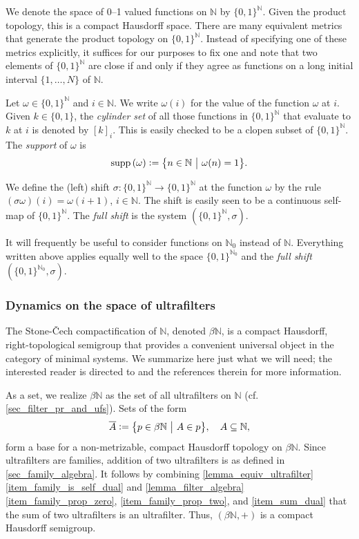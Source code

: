\documentclass[letter,11pt]{article}
\theoremstyle{plain}
\theoremstyle{definition}
\theoremstyle{plain}
\theoremstyle{plain}
\numberwithin{equation}{section}
\newcommand{\Cech}{\v{C}ech}
\newcommand{\supp}{{\normalfont\text{supp}}\,}
\newcommand{\N}{\mathbb{N}}
\newcommand{\defeq}{\vcentcolon=}
\begin{document}
We denote the space of 0--1 valued functions on $\N$ by $\{0,1\}^{\N}$. Given the product topology, this is a compact Hausdorff space.  There are many equivalent metrics that generate the product topology on $\{0,1\}^{\N}$.  Instead of specifying one of these metrics explicitly, it suffices for our purposes to fix one and note that two elements of $\{0,1\}^{\N}$ are close if and only if they agree as functions on a long initial interval $\{1, \ldots, N\}$ of $\N$.

Let $\omega \in \{0,1\}^{\N}$ and $i \in \N$.  We write $\omega(i)$ for the value of the function $\omega$ at $i$.  Given $k \in \{0,1\}$, the \emph{cylinder set} of all those functions in $\{0,1\}^{\N}$ that evaluate to $k$ at $i$ is denoted by $[k]_i$.  This is easily checked to be a clopen subset of $\{0,1\}^{\N}$.  The \emph{support} of $\omega$ is
\[\supp (\omega) \defeq \big\{ n \in \N \ \big| \ \omega(n) = 1 \big\}.\]

We define the (left) shift $\sigma: \{0,1\}^{\N} \to \{0,1\}^{\N}$ at the function $\omega$ by the rule $(\sigma \omega)(i) = \omega(i+1)$, $i \in \N$.  The shift is easily seen to be a continuous self-map of $\{0,1\}^{\N}$.  The \emph{full shift} is the system $(\{0,1\}^{\N}, \sigma)$.

It will frequently be useful to consider functions on $\N_0$ instead of $\N$.  Everything written above applies equally well to the space $\{0,1\}^{\N_0}$ and the \emph{full shift} $(\{0,1\}^{\N_0}, \sigma)$.


\subsubsection{Dynamics on the space of ultrafilters}
\label{sec_topology_and_ultrafilters}

The Stone-\Cech{} compactification of $\N$, denoted $\beta \N$, is a compact Hausdorff, right-topological semigroup that provides a convenient universal object in the category of minimal systems.  We summarize here just what we will need; the interested reader is directed to \cite[Ch. 19]{hindman_strauss_book_2012} and the references therein for more information.

As a set, we realize $\beta \N$ as the set of all ultrafilters on $\N$ (cf. \cref{sec_filter_pr_and_ufs}). Sets of the form
\[\overline{A} \defeq \big\{p \in \beta \N \ \big| \ A \in p \big\}, \quad A \subseteq \N,\]
form a base for a non-metrizable, compact Hausdorff topology on $\beta \N$.  Since ultrafilters are families, addition of two ultrafilters is as defined in \cref{sec_family_algebra}.  It follows by combining \cref{lemma_equiv_ultrafilter} \eqref{item_family_is_self_dual} and \cref{lemma_filter_algebra} \eqref{item_family_prop_zero}, \eqref{item_family_prop_two}, and \eqref{item_sum_dual} that the sum of two ultrafilters is an ultrafilter.  Thus, $(\beta \N, +)$ is a compact Hausdorff semigroup.
\end{document}

